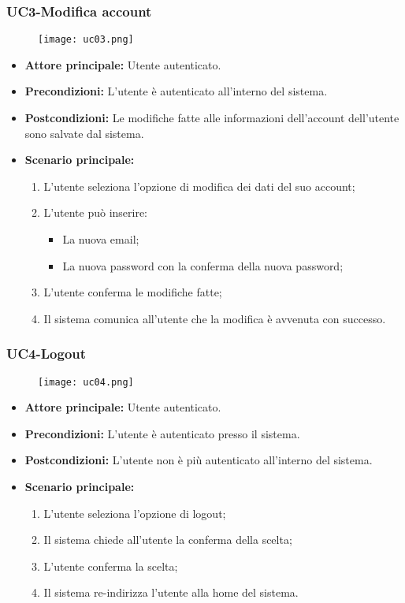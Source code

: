 
\subsubsection{UC3-Modifica account }
\begin{figure}[h] \texttt{[image: uc03.png]} \end{figure}
\begin{itemize}
    \item \textbf{Attore principale:} Utente autenticato.
    \item \textbf{Precondizioni:} L'utente è autenticato all'interno del sistema.
    \item \textbf{Postcondizioni:} Le modifiche fatte alle informazioni dell'account dell'utente sono
    salvate dal sistema.
    \item \textbf{Scenario principale:}
        \begin{enumerate}
            \item L'utente seleziona l'opzione di modifica dei dati del suo account;
            \item L'utente può inserire:
              \begin{itemize}
                \item La nuova email;
                \item La nuova password con la conferma della nuova password;
              \end{itemize}
            \item L'utente conferma le modifiche fatte;
            \item Il sistema comunica all'utente che la modifica è avvenuta con successo.
        \end{enumerate}
\end{itemize}

\subsubsection{UC4-Logout}
\begin{figure}[h] \texttt{[image: uc04.png]} \end{figure}
\begin{itemize}
    \item \textbf{Attore principale:} Utente autenticato.
    \item \textbf{Precondizioni:} L'utente è autenticato presso il sistema.
    \item \textbf{Postcondizioni:} L'utente non è più autenticato all'interno del sistema.
    \item \textbf{Scenario principale:}
    \begin{enumerate}
        \item L'utente seleziona l'opzione di logout;
        \item Il sistema chiede all'utente la conferma della scelta;
        \item L'utente conferma la scelta;
        \item Il sistema re-indirizza l'utente alla home del sistema.
    \end{enumerate}
\end{itemize}

